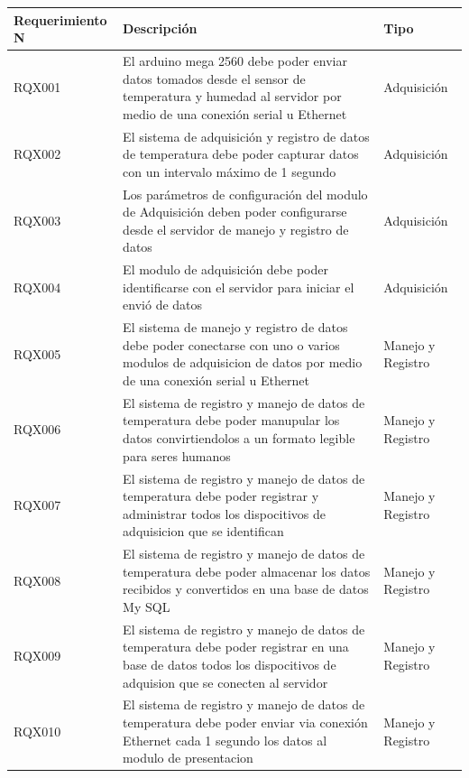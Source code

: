 \begin{table}[!h]
\begin{center}
\begin{tabular}{|p{30mm}|p{70mm}|p{30mm}|}
\hline
\rowcolor[RGB]{255,127,0} Requerimiento N & Descripción & Tipo \\
\hline
RQX001 & El arduino mega 2560 debe poder enviar datos tomados desde el sensor
de temperatura y humedad al servidor por medio de una conexión serial  u
Ethernet & Adquisición\\
\hline
RQX002 & El sistema de adquisición y registro de datos de temperatura debe poder
capturar datos con un intervalo máximo de 1 segundo & Adquisición \\
\hline
RQX003 & Los parámetros de configuración del modulo de Adquisición deben poder
configurarse desde el servidor de manejo y registro de datos & Adquisición \\
\hline
RQX004 & El modulo de adquisición debe poder identificarse con el servidor para
iniciar el envió de datos & Adquisición \\
\hline
RQX005 & El sistema de manejo y registro de datos debe poder conectarse con uno
o varios modulos de adquisicion de datos por medio de una conexión serial u
Ethernet & Manejo y Registro \\
\hline
RQX006 & El sistema de registro y manejo de datos de temperatura debe poder
manupular los  datos convirtiendolos a un formato legible para seres humanos &
Manejo y Registro\\
\hline
RQX007 & El sistema de registro y manejo de datos de temperatura debe poder
registrar y administrar todos los dispocitivos de adquisicion que se identifican
& Manejo y Registro\\
\hline
RQX008 & El sistema de registro y manejo de datos de temperatura debe poder
almacenar los datos recibidos y convertidos en una base de datos My SQL & Manejo
y Registro\\
\hline
RQX009 & El sistema de registro y manejo de datos de temperatura debe poder
registrar en una base de datos todos los dispocitivos de adquision que se
conecten al servidor & Manejo y Registro \\
\hline
RQX010 & El sistema de registro y manejo de datos de temperatura debe poder 
enviar via conexión Ethernet cada 1 segundo los datos al modulo de presentacion
& Manejo y Registro\\
\hline
\end{tabular}
\end{center}
\end{table}

